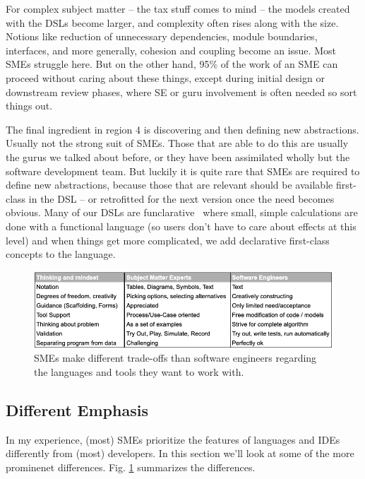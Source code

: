\documentclass[runningheads]{llncs}
\newcommand{\fig}[1]{Fig. \ref{#1}}  %
\begin{document}
For complex subject matter -- the tax stuff comes to mind -- the models created
with the DSLs become larger, and complexity often rises along with the size.
Notions like reduction of unnecessary dependencies, module boundaries,
interfaces, and more generally, cohesion and coupling become an issue. Most SMEs
struggle here. But on the other hand, 95\% of the work of an SME can proceed
without caring about these things, except during initial design or downstream
review phases, where SE or guru involvement is often needed so sort things out.

The final ingredient in region 4 is discovering and then defining new
abstractions. Usually not the strong suit of SMEs. Those that are able to
do this are usually the gurus we talked about before, or they have been
assimilated wholly but the software development team. But luckily it is
quite rare that SMEs are required to define new abstractions, because those
that are relevant should be available first-class in the DSL -- or retrofitted
for the next version once the need becomes obvious. Many of our DSLs are
funclarative~\cite{voelter2018fusing} where small, simple calculations are done with a functional
language (so users don't have to care about effects at this level) and 
when things get more complicated, we add declarative first-class concepts
to the language.
 
\begin{figure}
\begin{center}
    \includegraphics[width=1\columnwidth]{figures/table-prefs.png}
    \caption{SMEs make different trade-offs than software engineers 
    regarding the languages and tools they want to work with.}
    \label{table-prefs}
\end{center} 
\end{figure} 

\subsection{Different Emphasis}

In my experience, (most) SMEs prioritize the features of languages and IDEs differently
from (most) developers. In this section we'll look at some of the more prominenet differences.
\fig{table-prefs} summarizes the differences.
\end{document}
